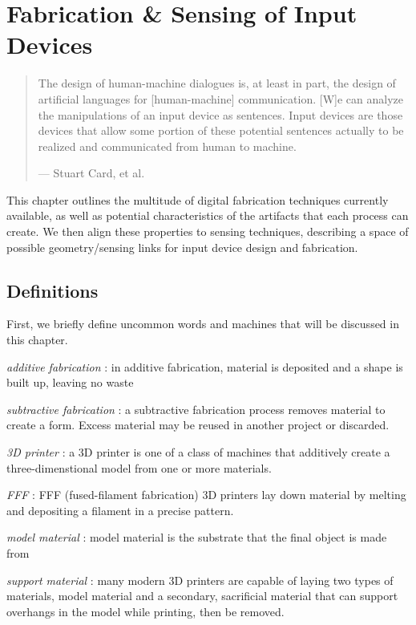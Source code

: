 \chapter{Fabrication \& Sensing of Input Devices}


\begin{quote}
The design of human-machine dialogues is, at least in part, the design of
artificial languages for [human-machine] communication. [W]e can analyze the
manipulations of an input device as sentences. Input devices are
those devices that allow some portion of these potential sentences actually to
be realized and communicated from human to machine.

--- Stuart Card, et al.

\end{quote}

This chapter outlines the multitude of digital fabrication techniques currently available, as well as potential characteristics of the artifacts that each process can create. We then align these properties to sensing techniques, describing a space of possible geometry/sensing links for input device design and fabrication.

\section{Definitions}

First, we briefly define uncommon words and machines that will be discussed in this chapter.

\emph{additive fabrication} : in additive fabrication, material is deposited and a shape is built up, leaving no waste

\emph{subtractive fabrication} : a subtractive fabrication process removes material to create a form. Excess material may be reused in another project or discarded.

\emph{3D printer} : a 3D printer is one of a class of machines that additively create a three-dimenstional model from one or more materials.

\emph{FFF} : FFF (fused-filament fabrication) 3D printers lay down material by melting and depositing a filament in a precise pattern.

\emph{model material} : model material is the substrate that the final object is made from

\emph{support material} : many modern 3D printers are capable of laying two types of materials, model material and a secondary, sacrificial material that can support overhangs in the model while printing, then be removed.

